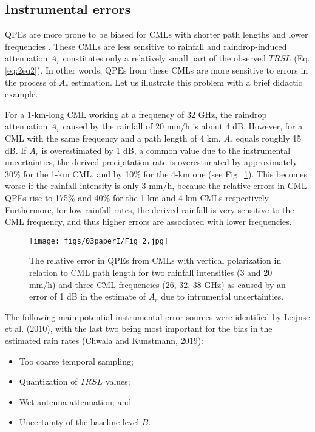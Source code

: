 \documentclass{ctuthesis}\usepackage[]{graphicx}\usepackage[]{color}
\begin{document}
\subsection{Instrumental errors} \label{InstErr}

QPEs are more prone to be biased for CMLs with shorter path lengths and lower frequencies \citep{leijnseMicrowaveLinkRainfall2008}. These CMLs are less sensitive to rainfall and raindrop-induced attenuation $A_r$ constitutes only a relatively small part of the observed $TRSL$ (Eq. \ref{eq:2eq2}). In other words, QPEs from these CMLs are more sensitive to errors in the process of $A_r$ estimation. Let us illustrate this problem with a brief didactic example. 

For a 1-km-long CML working at a frequency of 32 GHz, the raindrop attenuation $A_r$ caused by the rainfall of 20 mm/h is about 4 dB. However, for a CML with the same frequency and a path length of 4 km, $A_r$ equals roughly 15 dB. If $A_r$ is overestimated by 1 dB, a common value due to the instrumental uncertainties, the derived precipitation rate is overestimated by approximately 30\% for the 1-km CML, and by 10\% for the 4-km one (see Fig.~\ref{2The1}). This becomes worse if the rainfall intensity is only 3 mm/h, because the relative errors in CML QPEs rise to 175\% and 40\% for the 1-km and 4-km CMLs respectively. Furthermore, for low rainfall rates, the derived rainfall is very sensitive to the CML frequency, and thus higher errors are associated with lower frequencies.

\begin{figure}[h]
\begin{center}
\texttt{[image: figs/03paperI/Fig 2.jpg]}
\caption{The relative error in QPEs from CMLs with vertical polarization in relation to CML path length for two rainfall intensities (3 and 20 mm/h) and three CML frequencies (26, 32, 38 GHz) as caused by an error of 1 dB in the estimate of $A_r$ due to intrumental uncertainties.} \label{2The1}
\end{center}
\end{figure}

The following main potential instrumental error sources were identified by Leijnse et al. (2010), with the last two being most important for the bias in the estimated rain rates (Chwala and Kunstmann, 2019): 
\begin{itemize}
        \item Too coarse temporal sampling; 
        \item Quantization of $TRSL$ values; 
        \item Wet antenna attenuation; and
        \item Uncertainty of the baseline level $B$.
\end{itemize}
\end{document}
